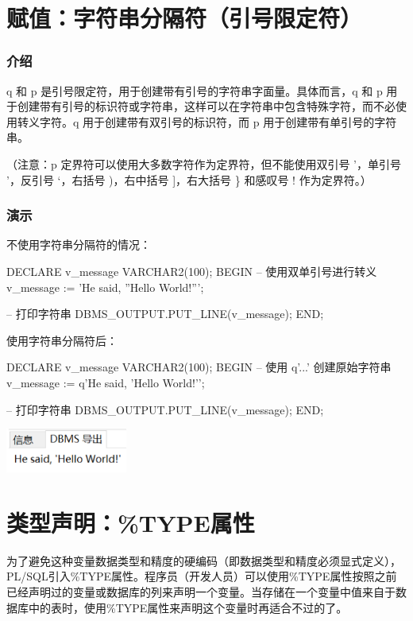 \documentclass[11pt, a4paper, oneside, UTF8]{ctexbook}
\begin{document}
\section{赋值：字符串分隔符（引号限定符）}
\subsubsection{介绍}
q 和 p 是引号限定符，用于创建带有引号的字符串字面量。具体而言，q 和 p 用于创建带有引号的标识符或字符串，这样可以在字符串中包含特殊字符，而不必使用转义字符。q 用于创建带有双引号的标识符，而 p 用于创建带有单引号的字符串。

（注意：p 定界符可以使用大多数字符作为定界符，但不能使用双引号 '，单引号 '，反引号 `，右括号 )，右中括号 ]，右大括号 \} 和感叹号 ! 作为定界符。）
\subsubsection{演示}
不使用字符串分隔符的情况：
\begin{plsql}[caption=不使用字符串分隔符]
DECLARE
  v_message VARCHAR2(100);
BEGIN
  -- 使用双单引号进行转义
  v_message := 'He said, ''Hello World!''';

  -- 打印字符串
  DBMS_OUTPUT.PUT_LINE(v_message);
END;
\end{plsql}
使用字符串分隔符后：
\begin{plsql}[caption=使用字符串分隔符]
DECLARE
  v_message VARCHAR2(100);
BEGIN
  -- 使用 q'...' 创建原始字符串
  v_message := q'{He said, 'Hello World!'}';

  -- 打印字符串
  DBMS_OUTPUT.PUT_LINE(v_message);
END;
\end{plsql}
\begin{center}
  \begin{minipage}{\textwidth}
    \center
    \includegraphics[width=0.3\textwidth]{picture/字符串分隔符效果图.png}
    \captionsetup{hypcap=false}
    \label{fig:字符串分隔符效果图}
  \end{minipage}
\end{center}
\section{类型声明：\%TYPE属性}
为了避免这种变量数据类型和精度的硬编码（即数据类型和精度必须显式定义），PL/SQL引入\%TYPE属性。程序员（开发人员）可以使用\%TYPE属性按照之前已经声明过的变量或数据库的列来声明一个变量。当存储在一个变量中值来自于数据库中的表时，使用\%TYPE属性来声明这个变量时再适合不过的了。
\end{document}
